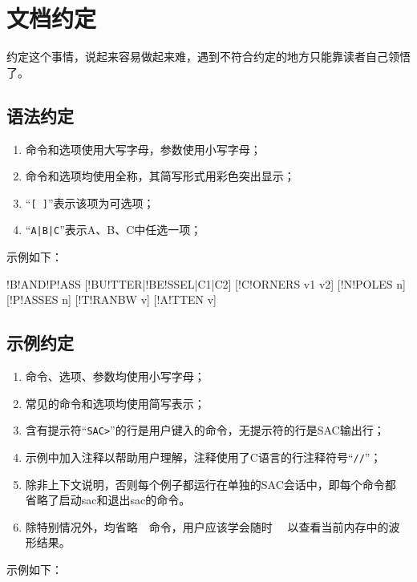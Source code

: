 \section{文档约定}
约定这个事情，说起来容易做起来难，遇到不符合约定的地方只能靠读者自己领悟了。

\subsection*{语法约定}
\begin{enumerate}
\item 命令和选项使用大写字母，参数使用小写字母；
\item 命令和选项均使用全称，其简写形式用彩色突出显示；
\item ``\lstinline{[ ]}''表示该项为可选项；
\item ``\lstinline{A|B|C}''表示A、B、C中任选一项；
\end{enumerate}

示例如下：
\begin{SACSyntax}
!B!AND!P!ASS [!BU!TTER|!BE!SSEL|C1|C2] [!C!ORNERS v1 v2] [!N!POLES n] 
    [!P!ASSES n] [!T!RANBW v] [!A!TTEN v]
\end{SACSyntax}

\subsection*{示例约定}
\begin{enumerate}
\item 命令、选项、参数均使用小写字母；
\item 常见的命令和选项均使用简写表示；
\item 含有提示符``\lstinline{SAC>}''的行是用户键入的命令，无提示符的行是SAC输出行；
\item 示例中加入注释以帮助用户理解，注释使用了C语言的行注释符号``\lstinline{//}''；
\item 除非上下文说明，否则每个例子都运行在单独的SAC会话中，即每个命令都
    省略了启动sac和退出sac的命令。
\item 除特别情况外，均省略~~命令，用户应该学会随时~~
    以查看当前内存中的波形结果。
\end{enumerate}

示例如下：
